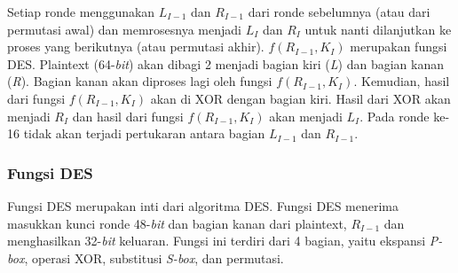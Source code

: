 Setiap ronde menggunakan \begin{math}L_{I-1}\end{math} dan \begin{math}R_{I-1}\end{math} dari ronde sebelumnya (atau dari permutasi awal) dan memrosesnya menjadi \begin{math}L_I\end{math} dan \begin{math}R_I\end{math} untuk nanti dilanjutkan ke proses yang berikutnya (atau permutasi akhir). \begin{math}f(R_{I-1},K_I)\end{math}  merupakan fungsi DES. Plaintext (64-\textit{bit}) akan dibagi 2 menjadi bagian kiri (\textit{L}) dan bagian kanan (\textit{R}). Bagian kanan akan diproses lagi oleh fungsi \begin{math}f(R_{I-1},K_I)\end{math}. Kemudian, hasil dari fungsi \begin{math}f(R_{I-1},K_I)\end{math} akan di XOR dengan bagian kiri. Hasil dari XOR akan menjadi \begin{math}R_I\end{math} dan hasil dari fungsi \begin{math}f(R_{I-1},K_I)\end{math} akan menjadi \begin{math}L_I\end{math}. Pada ronde ke-16 tidak akan terjadi pertukaran antara bagian \begin{math}L_{I-1}\end{math} dan \begin{math}R_{I-1}\end{math}.

\subsubsection{Fungsi DES}
Fungsi DES merupakan inti dari algoritma DES. Fungsi DES menerima masukkan kunci ronde 48-\textit{bit} dan bagian kanan dari plaintext, \begin{math}R_{I-1}\end{math} dan menghasilkan 32-\textit{bit} keluaran. Fungsi ini terdiri dari 4 bagian, yaitu ekspansi \textit{P-box}, operasi XOR, substitusi \textit{S-box}, dan permutasi.

